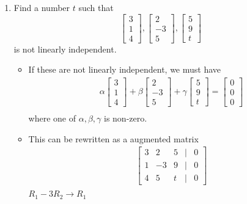 \documentclass[11pt]{article}
\begin{document}
\begin{enumerate}
	
    \clearpage
	\item Find a number $t$ such that
	\begin{equation*}
		\begin{bmatrix} 3 \\ 1 \\ 4 \end{bmatrix}, \begin{bmatrix} 2 \\ -3 \\ 5 \end{bmatrix}, \begin{bmatrix} 5 \\ 9 \\ t \end{bmatrix}
	\end{equation*}
	is not linearly independent.
  \begin{itemize}
    \item[] If these are not linearly independent, we must have \begin{align*}
      & \alpha \begin{bmatrix} 3 \\ 1 \\ 4 \end{bmatrix} + \beta \begin{bmatrix} 2 \\ -3 \\ 5 \end{bmatrix} + \gamma \begin{bmatrix} 5 \\ 9 \\ t \end{bmatrix} = \begin{bmatrix} 0 \\ 0 \\ 0 \end{bmatrix} \\
    \end{align*}
    where one of $\alpha, \beta, \gamma$ is non-zero. 
  \item[] This can be rewritten as a augmented matrix \begin{align*}
    & \begin{bmatrix} 3 & 2 & 5 & | & 0 \\ 1 & -3 & 9 & | & 0 \\ 4 & 5 & t & | & 0 \end{bmatrix} \\
    \end{align*}
    $R_1 - 3R_2 \rightarrow R_1 $

\end{itemize}
\end{enumerate}
\end{document}
